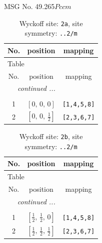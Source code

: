 \documentclass[fleqn,8pt]{jsarticle}
\begin{document}
\setcounter{MaxMatrixCols}{32}

\renewcommand{\tablename}{Table~}
\renewcommand{\figurename}{Figure~}
\begin{center}
\LARGE
MSG No. 49.265\quad$Pccm$
\end{center}
\renewcommand{\arraystretch}{1.2}
\begin{longtable}{ccc}
\caption{Wyckoff site: {\tt 2a}, site symmetry: {\tt ..2/m}}
 \\
 \hline \hline
No. & position & mapping \\ \hline \endfirsthead

\multicolumn{2}{l}{\tablename\ \thetable{}} \\
 \hline \hline
No. & position & mapping \\ \hline \endhead

 \hline \hline
\multicolumn{2}{r}{\footnotesize\it continued ...} \\ \endfoot

 \hline \hline
\multicolumn{2}{r}{} \\ \endlastfoot

1 & $\left[ 0,\, 0,\, 0 \right]$ & {\tt [1,4,5,8]} \\ \hline
2 & $\left[ 0,\, 0,\, \frac{1}{2} \right]$ & {\tt [2,3,6,7]} \\
\end{longtable}
\renewcommand{\arraystretch}{1.2}
\begin{longtable}{ccc}
\caption{Wyckoff site: {\tt 2b}, site symmetry: {\tt ..2/m}}
 \\
 \hline \hline
No. & position & mapping \\ \hline \endfirsthead

\multicolumn{2}{l}{\tablename\ \thetable{}} \\
 \hline \hline
No. & position & mapping \\ \hline \endhead

 \hline \hline
\multicolumn{2}{r}{\footnotesize\it continued ...} \\ \endfoot

 \hline \hline
\multicolumn{2}{r}{} \\ \endlastfoot

1 & $\left[ \frac{1}{2},\, \frac{1}{2},\, 0 \right]$ & {\tt [1,4,5,8]} \\ \hline
2 & $\left[ \frac{1}{2},\, \frac{1}{2},\, \frac{1}{2} \right]$ & {\tt [2,3,6,7]} \\
\end{longtable}
\end{document}
